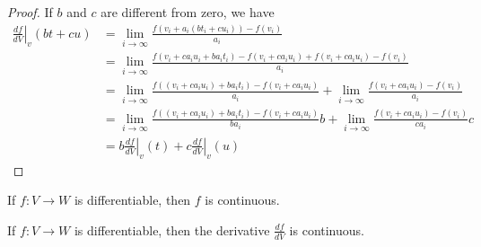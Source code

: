 \documentclass[11pt,letterpaper,fleqn]{memoir}
\begin{document}
\begin{proof}
	If $b$ and $c$ are different from zero, we have
	\begin{align*}		
	\left.\frac{df}{dV} \right|_{v} (b t + c u) &= \lim\limits_{i \to \infty} \frac{f(v_i + a_i (b t_i + c u_i)) - f(v_i)}{a_i} \\
	&= \lim\limits_{i \to \infty} \frac{f(v_i + c a_i u_i + b a_i t_i) - f(v_i + c a_i u_i) + f(v_i + c a_i u_i) - f(v_i)}{a_i} \\
	&= \lim\limits_{i \to \infty} \frac{f((v_i + c a_i u_i) + b a_i t_i) - f(v_i + c a_i u_i)}{a_i}
	+ \lim\limits_{i \to \infty} \frac{ f(v_i + c a_i u_i) - f(v_i)}{a_i} \\
	&= \lim\limits_{i \to \infty} \frac{f((v_i + c a_i u_i) + b a_i t_i) - f(v_i + c a_i u_i)}{b a_i} b
	+ \lim\limits_{i \to \infty} \frac{ f(v_i + c a_i u_i) - f(v_i)}{c a_i} c \\
	&= b \left.\frac{df}{dV} \right|_{v} (t) + c \left.\frac{df}{dV} \right|_{v} (u)
	\end{align*}
	
\end{proof}

\begin{conj}
	If $f : V \to W$ is differentiable, then $f$ is continuous. 
\end{conj}

\begin{conj}
	If $f : V \to W$ is differentiable, then the derivative $\frac{df}{dV}$ is continuous. 
\end{conj}
\end{document}
